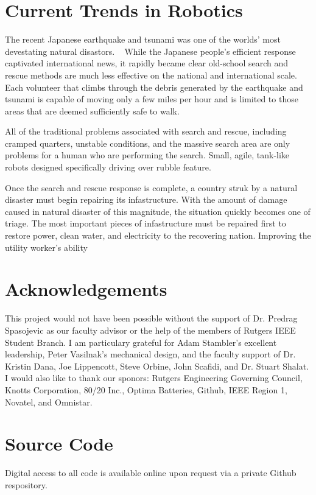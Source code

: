 \documentclass[11pt,twocolumn]{article}
\begin{document}
\section{Current Trends in Robotics}
\label{sec:econ}
The recent Japanese earthquake and tsunami was one of the worlds' most
devestating natural disastors. ~\cite{????} While the Japanese people's
efficient response captivated international news, it rapidly became clear
old-school search and rescue methods are much less effective on the national
and international scale. Each volunteer that climbs through the debris
generated by the earthquake and tsunami is capable of moving only a few miles
per hour and is limited to those areas that are deemed sufficiently safe to
walk.

All of the traditional problems associated with search and rescue, including
cramped quarters, unstable conditions, and the massive search area are only
problems for a human who are performing the search. Small, agile, tank-like
robots designed specifically driving over rubble feature. %

Once the search and rescue response is complete, a country struk by a natural
disaster must begin repairing its infastructure. With the amount of damage
caused in natural disaster of this magnitude, the situation quickly becomes one
of triage. The most important pieces of infastructure must be repaired first to
restore power, clean water, and electricity to the recovering nation. Improving
the utility worker's ability 





\section{Acknowledgements}
This project would not have been possible without the support of Dr. Predrag
Spasojevic as our faculty advisor or the help of the members of Rutgers IEEE
Student Branch. I am particulary grateful for Adam Stambler's excellent
leadership, Peter Vasilnak's mechanical design, and the faculty support of Dr.
Kristin Dana, Joe Lippencott, Steve Orbine, John Scafidi, and Dr. Stuart
Shalat. I would also like to thank our sponors: Rutgers Engineering Governing
Council, Knotts Corporation, 80/20 Inc., Optima Batteries, Github, IEEE Region
1, Novatel, and Omnistar.

\appendix
\section{Source Code}
Digital access to all code is available online upon request via a private
Github respository.

\end{document}
